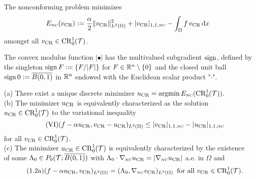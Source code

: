 The nonconforming problem minimizes
\begin{align}\label{e:defnonconfEintro}
E_\nc (\vcr) :=    \frac{\alpha}{2}   \|  \vcr \|_{L^2(\Omega)}^2 
+ | \vcr |_{1,1,\nc }  -\int_\Omega f\,  \vcr \dx
\end{align}
amongst all $\vcr\in \CR(\T)$.  
 

The convex modulus function $|\bullet|$ has the multivalued subgradient $\sign$, 
defined by the singleton
$\sign F:= \{ F/|F| \}$ for $F\in\R^n\setminus\{0\}$ and 
the closed unit ball $\sign 0:= \overline{ B(0,1)}$ in 
$\R^n$ endowed   with  the Euclidean scalar product "$\cdot$".   


\begin{theorem} 
  \label{thm:characterizationDiscreteSolutions}
(a) There exist a unique discrete minimizer
$
\ucr=\operatorname{argmin} E_\nc ( \CR(\T)).
$\\  
(b) The minimizer 
$\ucr$ is equivalently characterized as the solution $\ucr\in \CR(\T)$ to the variational inequality
\begin{equation}\label{eqccvarioineq} \tag{VI}
(f-\alpha\ucr, \vcr-\ucr)_{L^2(\Omega)}\le | \vcr |_{1,1,\nc }-| \ucr |_{1,1,\nc }
\end{equation}
for all $\vcr\in \CR(\T)$.
\\
(c) The minimizer $\ucr\in \CR(\T)$ is equivalently characterized by 
the existence of some
$\Lambda_0\in P_0(\T; \overline{ B(0,1)})$ with 
$\Lambda_0\cdot\nabla_\nc \ucr=|\nabla_\nc\ucr|$ a.e. in $\Omega$ and 
\begin{equation}
\label{eqLambda} \tag{1.2a}
(f-\alpha\ucr, \vcr)_{L^2(\Omega)}=(\Lambda_0,\nabla_\nc \vcr)_{L^2(\Omega)}
\,\text{ for all }\vcr\in \CR(\T).
\end{equation}
\end{theorem}


